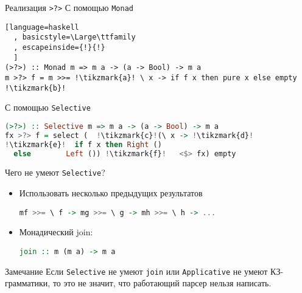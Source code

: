 \begin{frame}[fragile]{Реализация \texttt{>?>}}
\Large
С помощью \texttt{Monad}
\begin{lstlisting}[language=haskell
  , basicstyle=\Large\ttfamily
  , escapeinside={!}{!}
  ]
(>?>) :: Monad m => m a -> (a -> Bool) -> m a
m >?> f = m >>= !\tikzmark{a}! \ x -> if f x then pure x else empty !\tikzmark{b}!
\end{lstlisting}
\pause 

С помощью \texttt{Selective}
\begin{lstlisting}[language=haskell
  , basicstyle=\Large\ttfamily
  , escapechar=!
  , mathescape=false
  ]
(>?>) :: Selective m => m a -> (a -> Bool) -> m a
fx >?> f = select (  !\tikzmark{c}!(\ x -> !\tikzmark{d}!
!\tikzmark{e}!  if f x then Right () 
  else        Left ()) !\tikzmark{f}!   <$> fx) empty 
\end{lstlisting}
\end{frame}

\begin{frame}[fragile]{Чего не умеют \texttt{Selective}?}
\Large 
\begin{itemize}
\item Использовать несколько предыдущих результатов

  \lstinline[language=haskell, basicstyle=\Large\ttfamily]{mf >>= \ f -> mg >>= \ g -> mh >>= \ h -> ... }
\item Монадический join:

 \lstinline[language=haskell, basicstyle=\Large\ttfamily]{join :: m (m a) -> m a}
\end{itemize}
\newln 

\begin{block}{Замечание}
Если \texttt{Selective} не умеют \texttt{join}
или \texttt{Applicative} не умеют КЗ-грамматики, то это не значит, что работающий парсер нельзя написать.
\end{block}
\end{frame}



